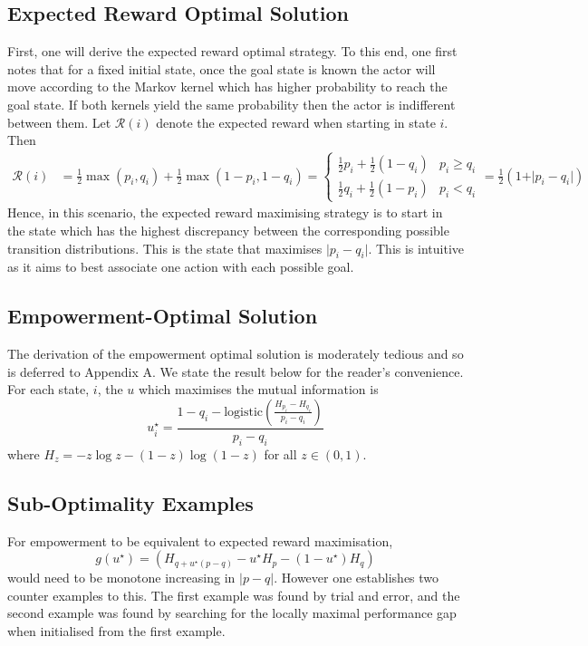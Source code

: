 \documentclass{article}
\newcommand{\Rr}{\mathcal{R}}
\begin{document}
\subsection{Expected Reward Optimal Solution}
First, one will derive the expected reward optimal strategy. To this end, one first notes that for a fixed initial state, once the goal state is known the actor will move according to the Markov kernel which has higher probability to reach the goal state. If both kernels yield the same probability then the actor is indifferent between them. Let $\Rr(i)$ denote the expected reward when starting in state $i$. Then
\begin{align*}
\Rr(i) 
	&= \frac{1}{2} \max(p_i,q_i) +\frac{1}{2} \max(1-p_i,1-q_i)
	=\begin{cases}
		\frac{1}{2} p_i +\frac{1}{2} (1-q_i) & p_i\geq q_i\\
		\frac{1}{2} q_i +\frac{1}{2} (1-p_i) & p_i < q_i
		\end{cases}
	=\frac{1}{2}(1+\vert p_i - q_i \vert) 	
\end{align*}
Hence, in this scenario, the expected reward maximising strategy is to start in the state which has the highest discrepancy between the corresponding possible transition distributions. This is the state that maximises $\vert p_i-q_i\vert$. This is intuitive as it aims to best associate one action with  each possible goal. 

\subsection{Empowerment-Optimal Solution}
The derivation of the empowerment optimal solution is moderately tedious and so is deferred to Appendix A. We state the result below for the reader's convenience. For each state, $i$, the $u$ which maximises the mutual information is 
\[u^\star_i=\frac{1-q_i-\text{logistic}\left(\frac{H_{p_i}-H_{q_i}}{p_i-q_i}\right)}{p_i-q_i} \]
where $H_z=-z\log z - (1-z)\log(1-z)$ for all $z\in (0,1)$. 

\subsection{Sub-Optimality Examples}
For empowerment to be equivalent to expected reward maximisation, 
\[g(u^\star)=\left(H_{q+u^\star(p-q)}-u^\star H_{p}-(1-u^\star)H_{q}\right)\] 
would need to be monotone increasing in $|p-q|$. However one establishes two counter examples to this. The first example was found by trial and error, and the second example was found by searching for the locally maximal performance gap when initialised from the first example. 
\end{document}
